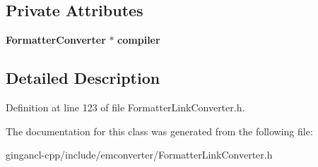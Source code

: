 \subsection*{Private Attributes}
\begin{CompactItemize}
\item 
{\bf FormatterConverter} $\ast$ {\bf compiler}\label{classbr_1_1pucrio_1_1telemidia_1_1ginga_1_1ncl_1_1emconverter_1_1FormatterLinkConverter_dbbd12a69462a88d0c59de7af28af3ee}

\end{CompactItemize}


\subsection{Detailed Description}




Definition at line 123 of file FormatterLinkConverter.h.

The documentation for this class was generated from the following file:\begin{CompactItemize}
\item 
gingancl-cpp/include/emconverter/FormatterLinkConverter.h\end{CompactItemize}
